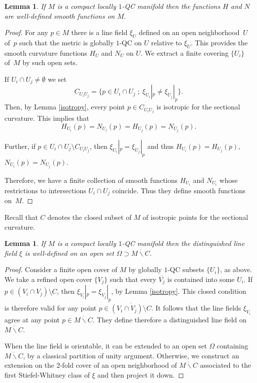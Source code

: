 \documentclass[JEP,XML,SOM,Unicode]{cedram}
\let\moins\smallsetminus
\newcommand{\sep}{\;;\;}
\newtheorem{lemma}[theorem]{Lemma}
\theoremstyle{definition}
\theoremstyle{remark}
\numberwithin{equation}{section}
\begin{document}
\begin{lemma}\label{local-isotrop}
If $M$ is a compact locally $1$-QC manifold then the functions $H$ and $N$ are well-defined smooth functions on $M$.
\end{lemma}
\begin{proof}
For any $p\in M$ there is a line field $\xi_U$ defined on an open neighborhood~$U$ of~$p$
such that the metric is globally $1$-QC on $U$ relative to $\xi_U$. This provides
the smooth curvature functions $H_U$ and $N_U$ on $U$.
We extract a finite covering $\{U_i\}$ of~$M$ by such open sets.

If $U_i\cap U_j\neq \emptyset$ we set
\[C_{U_iU_j}=\{p\in U_i\cap U_j\sep \xi_{U_i}|_p \neq \xi_{U_j}|_p\}.\]
Then, by Lemma \ref{isotropy}, every point $p\in C_{U_iU_j}$
is isotropic for the sectional curvature. This implies that
\[ H_{U_i}(p)=N_{U_i}(p)=H_{U_j}(p)=N_{U_j}(p).\]

Further, if $p\in U_i\cap U_j\setminus C_{U_iU_j}$, then $\xi_{U_i}|_p = \xi_{U_j}|_p$ and thus
$H_{U_i}(p)=H_{U_j}(p)$, $N_{U_i}(p)=N_{U_j}(p)$.

Therefore, we have a finite collection of smooth functions $H_{U_i}$ and $N_{U_i}$ whose restrictions
to intersections $U_i\cap U_j$ coincide. Thus they define smooth functions on~$M$.
\end{proof}

Recall that $C$ denotes the closed subset of $M$ of isotropic points for the sectional curvature.

\begin{lemma}\label{local-line}
If $M$ is a compact locally $1$-QC manifold then the distinguished line field $\xi$
is well-defined on an open set $\Omega \supset \overline{M\moins C}$.
\end{lemma}
\begin{proof}
Consider a finite open cover of $M$ by globally $1$-QC subsets $\{U_i\}$, as above.
We take a refined open cover $\{V_j\}$ such that every $\overline{V_j}$ is contained into some $U_i$.
If $p\in (V_i\cap V_j)\setminus C$, then $\xi_{V_i}|_p=\xi_{V_j}|_p$, by Lemma \ref{isotropy}.
This closed condition is therefore valid for any point $p\in \overline{(V_i\cap V_j)\setminus C}$.
It follows that the line fields $\xi_{V_i}$ agree at any point $p\in \overline{M\moins C}$. They define therefore
a distinguished line field on $\overline{M\moins C}$.

When the line field is orientable, it can be extended to an open set $\Omega$ containing $\overline{M\moins C}$, by a
classical partition of unity argument. Otherwise, we construct an exten\-sion on the 2-fold cover of an open neighborhood
of $\overline{M\moins C}$ associated to the first Stiefel-Whitney class of $\xi$ and then project it down.
\end{proof}
\end{document}
